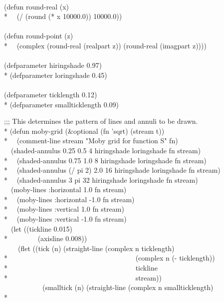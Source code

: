 \begin{new}
\begin{lisp}
\\
(defun round-real (x) \\*
~~(/ (round (* x 10000.0)) 10000.0)) \\
\\
(defun round-point (z) \\*
~~(complex (round-real (realpart z)) (round-real (imagpart z)))) \\
\\
(defparameter hiringshade 0.97) \\*
(defparameter loringshade 0.45) \\
\\
(defparameter ticklength 0.12) \\*
(defparameter smallticklength 0.09)
\end{lisp}
 \newpage%
\begin{lisp}
;;; This determines the pattern of lines and annuli to be drawn. \\*
(defun moby-grid (\&optional (fn 'sqrt) (stream t)) \\*
~~(comment-line stream "Moby grid for function {\Xtilde}S" fn) \\
~~(shaded-annulus 0.25 0.5 4 hiringshade loringshade fn stream) \\*
~~(shaded-annulus 0.75 1.0 8 hiringshade loringshade fn stream) \\*
~~(shaded-annulus (/ pi 2) 2.0 16 hiringshade loringshade fn stream) \\*
~~(shaded-annulus 3 pi 32 hiringshade loringshade fn stream) \\
~~(moby-lines :horizontal 1.0 fn stream) \\*
~~(moby-lines :horizontal -1.0 fn stream) \\*
~~(moby-lines :vertical 1.0 fn stream) \\*
~~(moby-lines :vertical -1.0 fn stream) \\
~~(let ((tickline 0.015) \\*
~~~~~~~~(axisline 0.008)) \\
~~~~(flet ((tick (n) (straight-line (complex n ticklength) \\*
~~~~~~~~~~~~~~~~~~~~~~~~~~~~~~~~~~~~(complex n (- ticklength)) \\*
~~~~~~~~~~~~~~~~~~~~~~~~~~~~~~~~~~~~tickline \\*
~~~~~~~~~~~~~~~~~~~~~~~~~~~~~~~~~~~~stream)) \\
~~~~~~~~~~~(smalltick (n) (straight-line (complex n smallticklength) \\*

\end{lisp}
\end{new}
